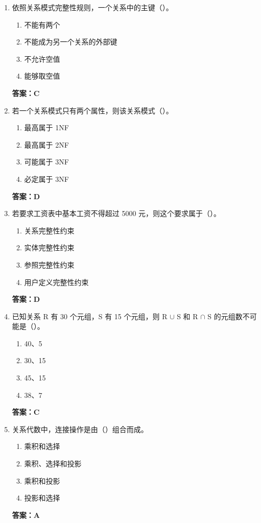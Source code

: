\documentclass[12pt, a4paper]{article}
\begin{document}
\begin{enumerate}[label=\arabic*.]
	\item 依照关系模式完整性规则，一个关系中的主键（\quad）。
	      \begin{enumerate}
		      \item 不能有两个
		      \item 不能成为另一个关系的外部键
		      \item 不允许空值
		      \item 能够取空值
	      \end{enumerate}
	      \textbf{答案：C}

	\item 若一个关系模式只有两个属性，则该关系模式（\quad）。
	      \begin{enumerate}
		      \item 最高属于 1NF
		      \item 最高属于 2NF
		      \item 可能属于 3NF
		      \item 必定属于 3NF
	      \end{enumerate}
	      \textbf{答案：D}

	\item 若要求工资表中基本工资不得超过 5000 元，则这个要求属于（\quad）。
	      \begin{enumerate}
		      \item 关系完整性约束
		      \item 实体完整性约束
		      \item 参照完整性约束
		      \item 用户定义完整性约束
	      \end{enumerate}
	      \textbf{答案：D}

	\item 已知关系 R 有 30 个元组，S 有 15 个元组，则 R $\cup$ S 和 R $\cap$ S 的元组数不可能是（\quad）。
	      \begin{enumerate}
		      \item 40、5
		      \item 30、15
		      \item 45、15
		      \item 38、7
	      \end{enumerate}
	      \textbf{答案：C}

	\item 关系代数中，连接操作是由（\quad）组合而成。
	      \begin{enumerate}
		      \item 乘积和选择
		      \item 乘积、选择和投影
		      \item 乘积和投影
		      \item 投影和选择
	      \end{enumerate}
	      \textbf{答案：A}


\end{enumerate}
\end{document}
